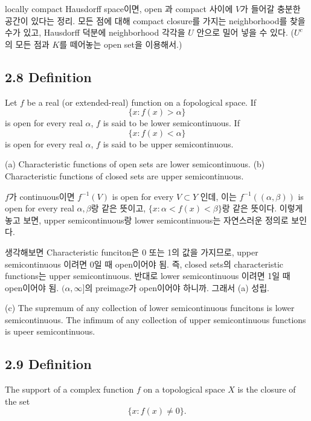 \documentclass[11pt,reqno]{amsart}
\renewcommand{\(}{\left(}
\renewcommand{\)}{\right)}
\renewcommand{\[}{\left[}
\renewcommand{\]}{\right]}
\begin{document}
locally compact Hausdorff space이면, open 과 compact 사이에 $V$가 들어갈 충분한 공간이 있다는 정리. 모든 점에 대해 compact closure를 가지는
neighborhood를 찾을 수가 있고, Hausdorff 덕분에 neighborhood 각각을 $U$ 안으로 밀어 넣을 수 있다. ($U^c$의 모든 점과 $K$를 떼어놓는 open set을
이용해서.)

\subsection{2.8 Definition}

Let $f$ be a real (or extended-real) function on a fopological space. If 
\begin{equation}
  \{ x : f (x) > \alpha \}
\end{equation}
is open for every real $\alpha$, $f$ is said to be lower semicontinuous. If 
\begin{equation}
  \{ x : f (x) < \alpha \}
\end{equation}
is open for every real $\alpha$, $f$ is said to be upper semicontinuous.

(a) Characteristic functions of open sets are lower semicontinuous.
(b) Characteristic functions of closed sets are upper semicontinuous.

$f$가 continuous이면 $f^{-1} (V)$ is open for every $V \subset Y$ 인데, 이는 $f^{-1} ((\alpha, \beta))$ is open for every real $\alpha, 
\beta$랑 같은 뜻이고, $\{ x : \alpha< f (x) < \beta \}$랑 같은 뜻이다. 이렇게 놓고 보면, upper semicontinuous랑 lower semicontinuous는 
자연스러운 정의로 보인다.

생각해보면 Characteristic funciton은 0 또는 1의 값을 가지므로, upper semicontinuous 이려면 0일 때 open이어야 됨. 즉, closed sets의 characteristic
functions는 upper semicontinuous. 반대로 lower semicontinuous 이려면 1일 때 open이어야 됨. $(\alpha, \infty]$의 preimage가 open이어야 하니까. 
그래서 (a) 성립.

(c) The supremum of any collection of lower semicontinuous funcitons is lower semicontinuous. 
The infimum of any collection of upper semicontinuous functions is upeer semicontinuous.

\subsection{2.9 Definition}

The support of a complex function $f$ on a topological space $X$ is the closure of the set 
\begin{equation}
  \{ x : f (x) \neq 0 \}.
\end{equation}
\end{document}
